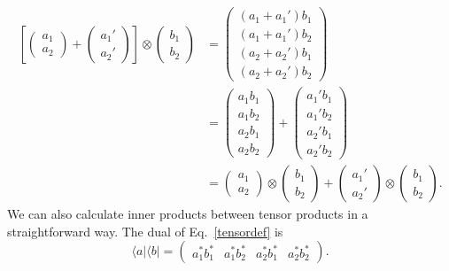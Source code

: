 \documentclass[pra,12pt]{revtex4-2}
\begin{document}
\begin{align}
  \left[\begin{pmatrix} a_1 \\ a_2 \end{pmatrix}
    + \begin{pmatrix} a_1' \\ a_2' \end{pmatrix} \right]
  \otimes \begin{pmatrix} b_1 \\ b_2 \end{pmatrix}
  &=
  \begin{pmatrix} (a_1+a_1') b_1 \\ (a_1+a_1') b_2 \\
    (a_2+a_2') b_1 \\ (a_2+a_2') b_2 \end{pmatrix} \\
  &=
  \begin{pmatrix} a_1 b_1 \\ a_1 b_2 \\ a_2 b_1 \\ a_2 b_2 \end{pmatrix}
  + \begin{pmatrix} a_1' b_1 \\ a_1' b_2 \\ a_2' b_1 \\ a_2' b_2 \end{pmatrix}\\
  &= \begin{pmatrix} a_1 \\ a_2 \end{pmatrix} \otimes
  \begin{pmatrix} b_1 \\ b_2 \end{pmatrix}
  + \begin{pmatrix} a_1' \\ a_2' \end{pmatrix} \otimes
  \begin{pmatrix} b_1 \\ b_2 \end{pmatrix}.
\end{align}
We can also calculate inner products between tensor products in a
straightforward way.  The dual of Eq.~\eqref{tensordef} is
\begin{equation}
  \langle a| \langle b| =
  \begin{pmatrix} a_1^* b_1^* & a_1^* b_2^*
    & a_2^* b_1^* & a_2^* b_2^* \end{pmatrix}.
\end{equation}
\end{document}
